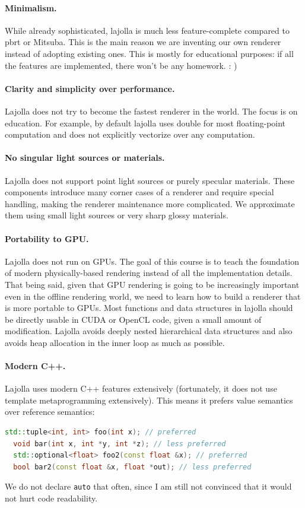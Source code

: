 \paragraph{Minimalism.} While already sophisticated, lajolla is much less feature-complete compared to pbrt or Mitsuba. This is the main reason we are inventing our own renderer instead of adopting existing ones. This is mostly for educational purposes: if all the features are implemented, there won't be any homework. : )

\paragraph{Clarity and simplicity over performance.} Lajolla does not try to become the fastest renderer in the world. The focus is on education. For example, by default lajolla uses double for most floating-point computation and does not explicitly vectorize over any computation.

\paragraph{No singular light sources or materials.} Lajolla does not support point light sources or purely specular materials. These components introduce many corner cases of a renderer and require special handling, making the renderer maintenance more complicated. We approximate them using small light sources or very sharp glossy materials.

\paragraph{Portability to GPU.} Lajolla does not run on GPUs. The goal of this course is to teach the foundation of modern physically-based rendering instead of all the implementation details. That being said, given that GPU rendering is going to be increasingly important even in the offline rendering world, we need to learn how to build a renderer that is more portable to GPUs. Most functions and data structures in lajolla should be directly usable in CUDA or OpenCL code, given a small amount of modification. Lajolla avoids deeply nested hierarchical data structures and also avoids heap allocation in the inner loop as much as possible.

\paragraph{Modern C++.} Lajolla uses modern C++ features extensively (fortunately, it does not use template metaprogramming extensively). This means it prefers value semantics over reference semantics:
\begin{lstlisting}[language=C++]
  std::tuple<int, int> foo(int x); // preferred
  void bar(int x, int *y, int *z); // less preferred
  std::optional<float> foo2(const float &x); // preferred
  bool bar2(const float &x, float *out); // less preferred
\end{lstlisting}
We do not declare \lstinline{auto} that often, since I am still not convinced that it would not hurt code readability.


